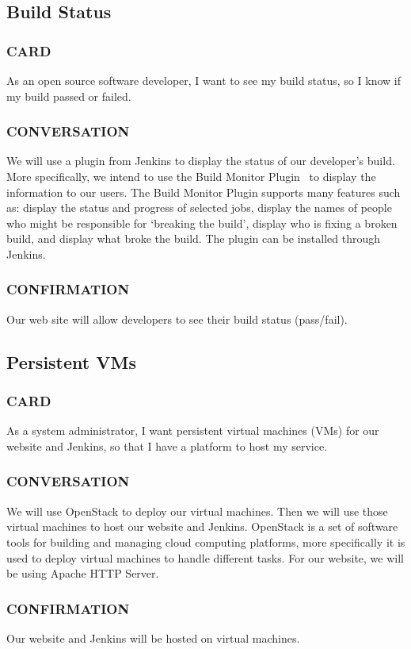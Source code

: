 \documentclass[10pt,letterpaper,onecolumn,journal]{IEEEtran}
\begin{document}
\subsection{Build Status}
\subsubsection{CARD}
As an open source software developer, I want to see my build status, so I know if my build passed or failed.
\subsubsection{CONVERSATION}
We will use a plugin from Jenkins to display the status of our developer's build. More specifically, we intend to use the Build Monitor Plugin~\cite{buildmonitor} to display the information to our users. The Build Monitor Plugin supports many features such as: display the status and progress of selected jobs, display the names of people who might be responsible for `breaking the build', display who is fixing a broken build, and display what broke the build. The plugin can be installed through Jenkins.
\subsubsection{CONFIRMATION}
Our web site will allow developers to see their build status (pass/fail).

\subsection{Persistent VMs}
\subsubsection{CARD}
As a system administrator, I want persistent virtual machines (VMs) for our website and Jenkins, so that I have a platform to host my service.
\subsubsection{CONVERSATION}
We will use OpenStack to deploy our virtual machines. Then we will use those virtual machines to host our website and Jenkins. OpenStack is a set of software tools for building and managing cloud computing platforms, more specifically it is used to deploy virtual machines to handle different tasks. For our website, we will be using Apache HTTP Server.
\subsubsection{CONFIRMATION}
Our website and Jenkins will be hosted on virtual machines.
\end{document}

